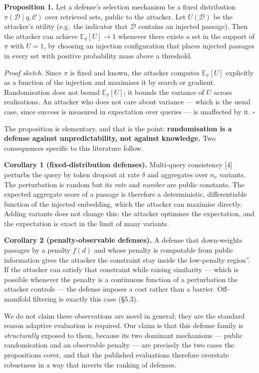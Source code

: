 \documentclass[review,3p,times]{elsarticle}
\begin{document}
\textbf{Proposition 1.} Let a defense's selection mechanism be a fixed distribution \(\pi(\mathcal{D} \mid q, \mathcal{C})\) over retrieved sets, public to the attacker. Let \(U(\mathcal{D})\) be the attacker's utility (e.g.~the indicator that \(\mathcal{D}\) contains an injected passage). Then the attacker can achieve \(\mathbb{E}_{\pi}[U] \to 1\) whenever there exists a set in the support of \(\pi\) with \(U = 1\), by choosing an injection configuration that places injected passages in every set with positive probability mass above a threshold.

\emph{Proof sketch.} Since \(\pi\) is fixed and known, the attacker computes \(\mathbb{E}_\pi[U]\) explicitly as a function of the injection and maximises it by search or gradient. Randomisation does not bound \(\mathbb{E}_\pi[U]\); it bounds the variance of \(U\) across realisations. An attacker who does not care about variance --- which is the usual case, since success is measured in expectation over queries --- is unaffected by it. \(\square\)

The proposition is elementary, and that is the point: \textbf{randomisation is a defense against unpredictability, not against knowledge.} Two consequences specific to this literature follow.

\textbf{Corollary 1 (fixed-distribution defenses).} Multi-query consistency {[}4{]} perturbs the query by token dropout at rate \(\delta\) and aggregates over \(n_v\) variants. The perturbation is random but its \emph{rate} and \emph{number} are public constants. The expected aggregate score of a passage is therefore a deterministic, differentiable function of the injected embedding, which the attacker can maximise directly. Adding variants does not change this: the attacker optimises the expectation, and the expectation is exact in the limit of many variants.

\textbf{Corollary 2 (penalty-observable defenses).} A defense that down-weights passages by a penalty \(f(d)\) and whose penalty is computable from public information gives the attacker the constraint \texttt{}stay inside the low-penalty region''. If the attacker can satisfy that constraint while raising similarity --- which is possible whenever the penalty is a continuous function of a perturbation the attacker controls --- the defense imposes a cost rather than a barrier. Off-manifold filtering is exactly this case (§5.3).

We do not claim these observations are novel in general; they are the standard reason adaptive evaluation is required. Our claim is that this defense family is \emph{structurally} exposed to them, because its two dominant mechanisms --- public randomisation and an observable penalty --- are precisely the two cases the propositions cover, and that the published evaluations therefore overstate robustness in a way that inverts the ranking of defenses.
\end{document}
